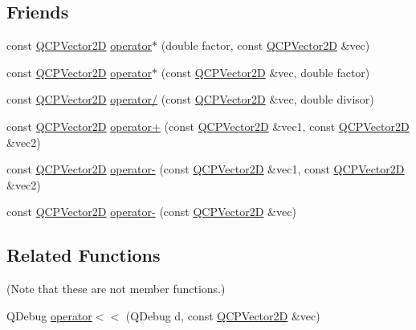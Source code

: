 \subsection*{Friends}
\begin{DoxyCompactItemize}
\item 
const \hyperlink{class_q_c_p_vector2_d}{Q\+C\+P\+Vector2D} \hyperlink{class_q_c_p_vector2_d_aa75268fb64b9eaee5448fb815007bee9}{operator$\ast$} (double factor, const \hyperlink{class_q_c_p_vector2_d}{Q\+C\+P\+Vector2D} \&vec)
\item 
const \hyperlink{class_q_c_p_vector2_d}{Q\+C\+P\+Vector2D} \hyperlink{class_q_c_p_vector2_d_aace10d28a76e84e7380ede1a9cb58274}{operator$\ast$} (const \hyperlink{class_q_c_p_vector2_d}{Q\+C\+P\+Vector2D} \&vec, double factor)
\item 
const \hyperlink{class_q_c_p_vector2_d}{Q\+C\+P\+Vector2D} \hyperlink{class_q_c_p_vector2_d_aa69909afc8c656999a2ea292ea01244b}{operator/} (const \hyperlink{class_q_c_p_vector2_d}{Q\+C\+P\+Vector2D} \&vec, double divisor)
\item 
const \hyperlink{class_q_c_p_vector2_d}{Q\+C\+P\+Vector2D} \hyperlink{class_q_c_p_vector2_d_a24cc5985429b12dbed4d0d3c5a917d20}{operator+} (const \hyperlink{class_q_c_p_vector2_d}{Q\+C\+P\+Vector2D} \&vec1, const \hyperlink{class_q_c_p_vector2_d}{Q\+C\+P\+Vector2D} \&vec2)
\item 
const \hyperlink{class_q_c_p_vector2_d}{Q\+C\+P\+Vector2D} \hyperlink{class_q_c_p_vector2_d_a9e01331d8debf0877ee4cba9abd83605}{operator-\/} (const \hyperlink{class_q_c_p_vector2_d}{Q\+C\+P\+Vector2D} \&vec1, const \hyperlink{class_q_c_p_vector2_d}{Q\+C\+P\+Vector2D} \&vec2)
\item 
const \hyperlink{class_q_c_p_vector2_d}{Q\+C\+P\+Vector2D} \hyperlink{class_q_c_p_vector2_d_a14c807d345ee3f22d6809bb5a4137b52}{operator-\/} (const \hyperlink{class_q_c_p_vector2_d}{Q\+C\+P\+Vector2D} \&vec)
\end{DoxyCompactItemize}
\subsection*{Related Functions}
(Note that these are not member functions.) \begin{DoxyCompactItemize}
\item 
Q\+Debug \hyperlink{class_q_c_p_vector2_d_a6c757af9671d925af4a36c2f58fb7234}{operator$<$$<$} (Q\+Debug d, const \hyperlink{class_q_c_p_vector2_d}{Q\+C\+P\+Vector2D} \&vec)
\end{DoxyCompactItemize}


